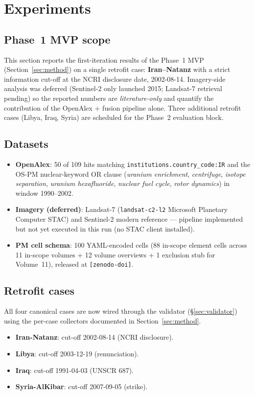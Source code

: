 \documentclass[11pt,a4paper]{article}
\begin{document}
\section{Experiments}\label{sec:eval}

\subsection{Phase~1 MVP scope}
This section reports the first-iteration results of the Phase~1 MVP
(Section~\ref{sec:method}) on a single retrofit case: \textbf{Iran--Natanz}
with a strict information cut-off at the NCRI disclosure date,
2002-08-14. Imagery-side analysis was deferred (Sentinel-2 only launched
2015; Landsat-7 retrieval pending) so the reported numbers are
\emph{literature-only} and quantify the contribution of the OpenAlex +
fusion pipeline alone. Three additional retrofit cases (Libya, Iraq,
Syria) are scheduled for the Phase~2 evaluation block.

\subsection{Datasets}
\begin{itemize}[leftmargin=*,itemsep=2pt]
  \item \textbf{OpenAlex}: 50 of 109 hits matching
        \texttt{institutions.country\_code:IR} and the OS-PM
        nuclear-keyword OR clause (\textit{uranium enrichment},
        \textit{centrifuge}, \textit{isotope separation},
        \textit{uranium hexafluoride}, \textit{nuclear fuel cycle},
        \textit{rotor dynamics}) in window 1990--2002.
  \item \textbf{Imagery (deferred)}: Landsat-7 (\texttt{landsat-c2-l2}
        Microsoft Planetary Computer STAC) and Sentinel-2 modern
        reference --- pipeline implemented but not yet executed in this
        run (no STAC client installed).
  \item \textbf{PM cell schema}: 100 YAML-encoded cells (88 in-scope
        element cells across 11 in-scope volumes + 12 volume overviews
        + 1 exclusion stub for Volume~11), released at
        \texttt{[zenodo-doi]}.
\end{itemize}

\subsection{Retrofit cases}
All four canonical cases are now wired through the validator
(\S\ref{sec:validator}) using the per-case collectors documented in
Section~\ref{sec:method}.
\begin{itemize}[leftmargin=*,itemsep=2pt]
  \item \textbf{Iran-Natanz}: cut-off 2002-08-14 (NCRI disclosure).
  \item \textbf{Libya}: cut-off 2003-12-19 (renunciation).
  \item \textbf{Iraq}: cut-off 1991-04-03 (UNSCR 687).
  \item \textbf{Syria-AlKibar}: cut-off 2007-09-05 (strike).
\end{itemize}
\end{document}
